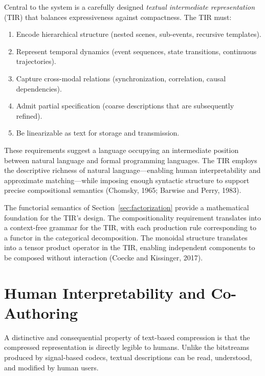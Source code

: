 \documentclass[11pt,a4paper]{article}
\theoremstyle{definition}
\theoremstyle{remark}
\begin{document}
Central to the system is a carefully designed \emph{textual intermediate representation} (TIR) that balances expressiveness against compactness. The TIR must:

\begin{enumerate}[noitemsep]
\item Encode hierarchical structure (nested scenes, sub-events, recursive templates).
\item Represent temporal dynamics (event sequences, state transitions, continuous trajectories).
\item Capture cross-modal relations (synchronization, correlation, causal dependencies).
\item Admit partial specification (coarse descriptions that are subsequently refined).
\item Be linearizable as text for storage and transmission.
\end{enumerate}

These requirements suggest a language occupying an intermediate position between natural language and formal programming languages. The TIR employs the descriptive richness of natural language---enabling human interpretability and approximate matching---while imposing enough syntactic structure to support precise compositional semantics (Chomsky, 1965; Barwise and Perry, 1983).

The functorial semantics of Section~\ref{sec:factorization} provide a mathematical foundation for the TIR's design. The compositionality requirement translates into a context-free grammar for the TIR, with each production rule corresponding to a functor in the categorical decomposition. The monoidal structure translates into a tensor product operator in the TIR, enabling independent components to be composed without interaction (Coecke and Kissinger, 2017).

\section{Human Interpretability and Co-Authoring}
\label{sec:human}

A distinctive and consequential property of text-based compression is that the compressed representation is directly legible to humans. Unlike the bitstreams produced by signal-based codecs, textual descriptions can be read, understood, and modified by human users.
\end{document}
